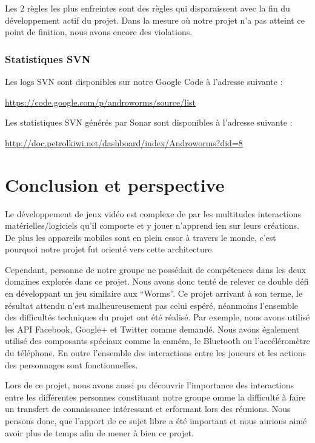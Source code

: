\documentclass{report}
\begin{document}
Les 2 règles les plus enfreintes sont des règles qui disparaissent avec
la fin du développement actif du projet. Dans la mesure où notre projet
n’a pas atteint ce point de finition, nous avons encore des violations.

\subsubsection{Statistiques SVN}

Les logs SVN sont disponibles sur notre Google Code à l’adresse suivante :

\url{https://code.google.com/p/androworms/source/list}

\bigskip

Les statistiques SVN générés par Sonar sont disponibles à l’adresse suivante :

\url{http://doc.petrolkiwi.net/dashboard/index/Androworms?did=8}


\section{Conclusion et perspective}

Le développement de jeux vidéo est complexe de par les multitudes
interactions matérielles/logiciels qu’il comporte et y jouer n’apprend
ien sur leurs créations. De plus les appareils mobiles sont en plein
essor à travers le monde, c’est pourquoi notre projet fut orienté vers
cette architecture.

Cependant, personne de notre groupe ne possédait de compétences dans
les deux domaines explorés dans ce projet. Nous avons donc tenté de
relever ce double défi en développant un jeu similaire aux “Worms”.
Ce projet arrivant à son terme, le résultat attendu n’est
malheureusement pas celui espéré, néanmoins l’ensemble des difficultés
techniques du projet ont été réalisé. Par exemple, nous avons utilisé
les API Facebook, Google+ et Twitter comme demandé. Nous avons également
utilisé des composants spéciaux comme la caméra, le Bluetooth ou
l’accéléromètre du téléphone. En outre l’ensemble des interactions entre
les joueurs et les actions des personnages sont fonctionnelles. 

Lors de ce projet, nous avons aussi pu découvrir l’importance des
interactions entre les différentes personnes constituant notre groupe
omme la difficulté à faire un transfert de connaissance intéressant et
erformant lors des réunions. Nous pensons donc, que l’apport de ce sujet
libre a été important et nous aurions aimé avoir plus de temps afin de
mener à bien ce projet.
\end{document}
